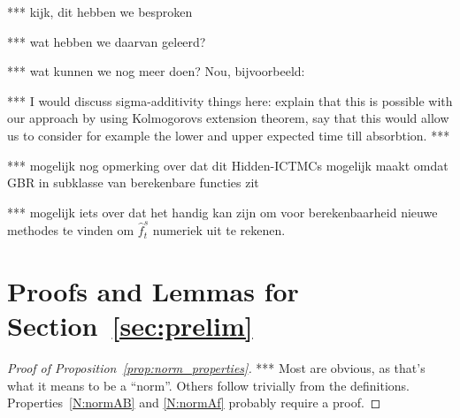 \documentclass[10pt]{paper}
\theoremstyle{definition}
\begin{document}
*** kijk, dit hebben we besproken

*** wat hebben we daarvan geleerd?

*** wat kunnen we nog meer doen? Nou, bijvoorbeeld:

*** I would discuss sigma-additivity things here: explain that this is possible with our approach by using Kolmogorovs extension theorem, say that this would allow us to consider for example the lower and upper expected time till absorbtion. ***

*** mogelijk nog opmerking over dat dit Hidden-ICTMCs mogelijk maakt omdat GBR in subklasse van berekenbare functies zit

*** mogelijk iets over dat het handig kan zijn om voor berekenbaarheid nieuwe methodes te vinden om $\hat{f}_t^s$ numeriek uit te rekenen.


 


\appendix

\section{Proofs and Lemmas for Section~\ref{sec:prelim}}

\begin{proof}[Proof of Proposition~\ref{prop:norm_properties}]
*** Most are obvious, as that's what it means to be a ``norm''. Others follow trivially from the definitions. Properties~\ref{N:normAB} and \ref{N:normAf} probably require a proof.
\end{proof}
\end{document}
